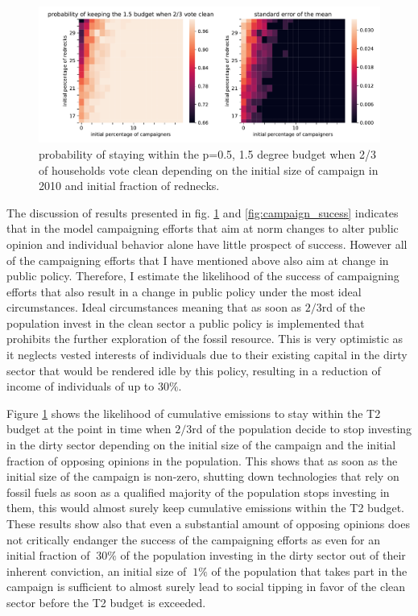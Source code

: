 \begin{figure}[t]
    \centering
    \includegraphics[width = \textwidth]{figures/p_budget15p66_at_campaign_success.pdf}
    \caption{probability of staying within the p=0.5, 1.5 degree budget when 2/3 of households vote clean depending on the initial size of campaign in 2010 and initial fraction of rednecks.}
    \label{fig:p15sucess}
\end{figure}

The discussion of results presented in fig. \ref{fig:p15sucess} and \ref{fig:campaign_sucess} indicates that in the model campaigning efforts that aim at norm changes to alter public opinion and individual behavior alone have little prospect of success. However all of the campaigning efforts that I have mentioned above also aim at change in public policy. Therefore, I estimate the likelihood of the success of campaigning efforts that also result in a change in public policy under the most ideal circumstances. Ideal circumstances meaning that as soon as $2/3$rd of the population invest in the clean sector a public policy is implemented that prohibits the further exploration of the fossil resource. This is very optimistic as it neglects vested interests of individuals due to their existing capital in the dirty sector that would be rendered idle by this policy, resulting in a reduction of income of individuals of up to $30\%$.


Figure \ref{fig:p15sucess} shows the likelihood of cumulative emissions to stay within the T2 budget at the point in time when $2/3$rd of the population decide to stop investing in the dirty sector depending on the initial size of the campaign and the initial fraction of opposing opinions in the population. This shows that as soon as the initial size of the campaign is non-zero, shutting down technologies that rely on fossil fuels as soon as a qualified majority of the population stops investing in them, this would almost surely keep cumulative emissions within the T2 budget. These results show also that even a substantial amount of opposing opinions does not critically endanger the success of the campaigning efforts as even for an initial fraction of $~30\%$ of the population investing in the dirty sector out of their inherent conviction, an initial size of $~1\%$ of the population that takes part in the campaign is sufficient to almost surely lead to social tipping in favor of the clean sector before the T2 budget is exceeded.

